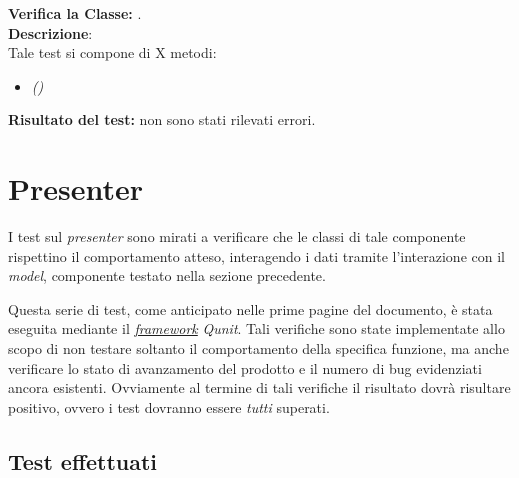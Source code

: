 \subsubsection{}
\textbf{Verifica la Classe:} \textit{}.\\
\textbf{Descrizione}:\\
Tale test si compone di X metodi:
\begin{itemize}
\item \textit{() } %
\end{itemize}
\textbf{Risultato del test:} non sono stati rilevati errori.


\section{Presenter}
I test sul \textit{presenter} sono mirati a verificare che le classi di tale componente rispettino il comportamento atteso, interagendo i dati tramite l'interazione con il \textit{model}, componente testato nella sezione precedente.

Questa serie di test, come anticipato nelle prime pagine del documento, è stata eseguita mediante il \underline{\textit{framework}} \textit{Qunit}. Tali verifiche sono state implementate allo scopo di non testare soltanto il comportamento della specifica funzione, ma anche verificare lo stato di avanzamento del prodotto e il numero di bug evidenziati ancora esistenti.
Ovviamente al termine di tali verifiche il risultato dovrà risultare positivo, ovvero i test dovranno essere \textit{tutti} superati.


\subsection{Test effettuati}
